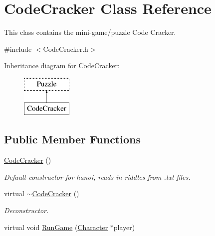 \hypertarget{classCodeCracker}{\section{Code\-Cracker Class Reference}
\label{classCodeCracker}
}


This class contains the mini-\/game/puzzle Code Cracker.  




{\ttfamily \#include $<$Code\-Cracker.\-h$>$}

Inheritance diagram for Code\-Cracker\-:\begin{figure}[H]
\begin{center}
\leavevmode
\includegraphics[height=2.000000cm]{classCodeCracker}
\end{center}
\end{figure}
\subsection*{Public Member Functions}
\begin{DoxyCompactItemize}
\item 
\hyperlink{classCodeCracker_a46b5ec438efd38104b9a406b45c8cd68}{Code\-Cracker} ()
\begin{DoxyCompactList}\small\item\em Default constructor for hanoi, reads in riddles from .txt files. \end{DoxyCompactList}\item 
virtual \hyperlink{classCodeCracker_ae7dc389e166286ca2271625154dde39c}{$\sim$\-Code\-Cracker} ()
\begin{DoxyCompactList}\small\item\em Deconstructor. \end{DoxyCompactList}\item 
virtual void \hyperlink{classCodeCracker_a663fb6edb8141efd3b1760e46ea9f4e9}{Run\-Game} (\hyperlink{classCharacter}{Character} $\ast$player)
\end{DoxyCompactItemize}
